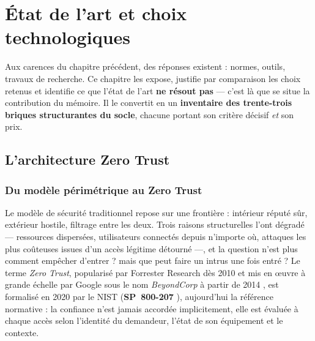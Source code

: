 \chapter{État de l'art et choix technologiques}
\label{ch:etat-art}

Aux carences du chapitre précédent, des réponses existent : normes, outils, travaux de recherche.
Ce chapitre les expose, justifie par comparaison les choix retenus et identifie ce que l'état de
l'art \textbf{ne résout pas} --- c'est là que se situe la contribution du mémoire. Il le convertit
en un \textbf{inventaire des trente-trois briques structurantes du socle}, chacune portant son
critère décisif \emph{et} son prix.

\section{L'architecture Zero Trust}
\label{sec:zt}

\subsection{Du modèle périmétrique au Zero Trust}
\label{sec:zt-origine}

Le modèle de sécurité traditionnel repose sur une frontière : intérieur réputé sûr, extérieur
hostile, filtrage entre les deux. Trois raisons structurelles l'ont dégradé --- ressources
dispersées, utilisateurs connectés depuis n'importe où, attaques les plus coûteuses issues d'un
accès légitime détourné ---, et la question n'est plus \og comment empêcher d'entrer ? \fg{} mais
\og que peut faire un intrus une fois entré ? \fg{} Le terme \emph{Zero Trust},
popularisé par Forrester Research dès 2010 \cite{kindervag2010} et mis en œuvre à grande échelle
par Google sous le nom \emph{BeyondCorp} à partir de 2014 \cite{beyondcorp2014}, est formalisé en
2020 par le NIST (\textbf{SP~800-207} \cite{nist800207}), aujourd'hui la référence normative : la
confiance n'est jamais accordée implicitement, elle est évaluée à chaque accès selon l'identité
du demandeur, l'état de son équipement et le contexte.

